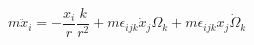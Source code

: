 \begin{equation}
m\ddot x_{i}=-\frac{x_{i}}{r}\frac{k }{r^{2}}+m\epsilon_{ijk}\dot
x_{j} \Omega_{k}+m\epsilon_{ijk}x_{j}\dot
\Omega_{k}\label{eq:kepler}
\end{equation}

